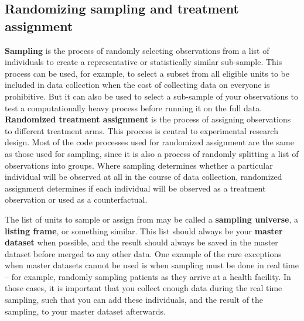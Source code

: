 \subsection{Randomizing sampling and treatment assignment}

\textbf{Sampling} is the process of randomly selecting observations
from a list of individuals to create a representative or statistically similar sub-sample.
This process can be used, for example, to select a subset from all eligible units
to be included in data collection when the cost of collecting data on everyone is prohibitive.
But it can also be used to select a sub-sample of your observations to test a computationally heavy process
before running it on the full data.
\textbf{Randomized treatment assignment} is the process of assigning observations to different treatment arms.
This process is central to experimental research design.
Most of the code processes used for randomized assignment are the same as those used for sampling,
since it is also a process of randomly splitting a list of observations into groups.
Where sampling determines whether a particular individual
will be observed at all in the course of data collection,
randomized assignment determines if each individual will be observed
as a treatment observation or used as a counterfactual.

The list of units to sample or assign from may be called a \textbf{sampling universe},
a \textbf{listing frame}, or something similar.
This list should always be your \textbf{master dataset} when possible,
and the result should always be saved in the master dataset
before merged to any other data.
One example of the rare exceptions
when master datasets cannot be used is
when sampling must be done in real time --
for example, randomly sampling patients
as they arrive at a health facility.
In those cases,
it is important that you collect enough data
during the real time sampling,
such that you can add these individuals,
and the result of the sampling,
to your master dataset afterwards.

